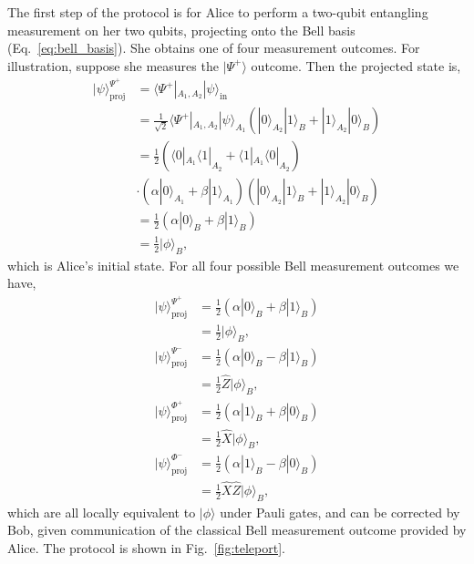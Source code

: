 \documentclass[aps,rmp,twocolumn,amsmath,amssymb,nofootinbib,superscriptaddress]{revtex4}
\newcommand{\bra}[1]{\langle#1|}
\newcommand{\ket}[1]{|#1\rangle}
\begin{document}
The first step of the protocol is for Alice to perform a two-qubit entangling measurement on her two qubits, projecting onto the Bell basis (Eq.~\ref{eq:bell_basis}). She obtains one of four measurement outcomes. For illustration, suppose she measures the $\ket{\Psi^+}$ outcome. Then the projected state is,
\begin{align}
\ket\psi_\mathrm{proj}^{\Psi^+} &= \bra{\Psi^+}_{A_1,A_2} \ket\psi_\mathrm{in} \nonumber \\
&= \frac{1}{\sqrt{2}} \bra{\Psi^+}_{A_1,A_2}\ket\psi_{A_1}(\ket{0}_{A_2}\ket{1}_B + \ket{1}_{A_2}\ket{0}_B) \nonumber \\
&= \frac{1}{2} (\bra{0}_{A_1}\bra{1}_{A_2} + \bra{1}_{A_1}\bra{0}_{A_2}) \nonumber \\
&\cdot (\alpha\ket{0}_{A_1}+\beta\ket{1}_{A_1})(\ket{0}_{A_2}\ket{1}_B + \ket{1}_{A_2}\ket{0}_B) \nonumber \\
&= \frac{1}{2} (\alpha \ket{0}_B + \beta \ket{1}_B)\nonumber \\
&= \frac{1}{2} \ket\phi_B,
\end{align}
which is Alice's initial state. For all four possible Bell measurement outcomes we have,
\begin{align}
\ket\psi_\mathrm{proj}^{\Psi^+} &= \frac{1}{2} (\alpha \ket{0}_B + \beta \ket{1}_B) \nonumber \\
&= \frac{1}{2} \ket\phi_B, \nonumber \\
\ket\psi_\mathrm{proj}^{\Psi^-} &= \frac{1}{2} (\alpha \ket{0}_B - \beta \ket{1}_B) \nonumber \\
&= \frac{1}{2} \hat{Z}\ket\phi_B, \nonumber \\
\ket\psi_\mathrm{proj}^{\Phi^+} &= \frac{1}{2} (\alpha \ket{1}_B + \beta \ket{0}_B) \nonumber \\
&= \frac{1}{2} \hat{X} \ket\phi_B, \nonumber \\
\ket\psi_\mathrm{proj}^{\Phi^-} &= \frac{1}{2} (\alpha \ket{1}_B - \beta \ket{0}_B) \nonumber \\
&= \frac{1}{2} \hat{X}\hat{Z}\ket\phi_B,
\end{align}
which are all locally equivalent to $\ket\phi$ under Pauli gates, and can be corrected by Bob, given communication of the classical Bell measurement outcome provided by Alice. The protocol is shown in Fig.~\ref{fig:teleport}.
\end{document}
